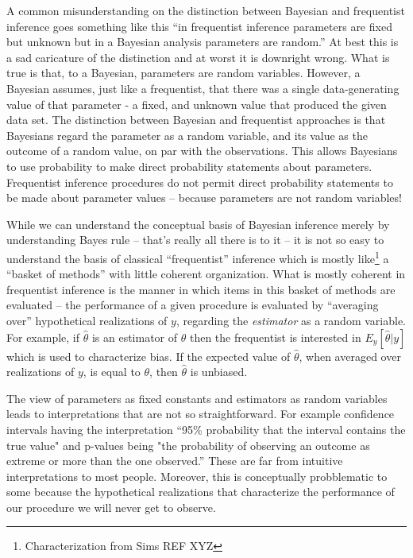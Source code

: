 A common misunderstanding on the distinction between Bayesian and
frequentist inference goes something like this ``in frequentist
inference parameters are fixed but unknown but in a Bayesian analysis
parameters are random.'' At best this is a sad caricature of the
distinction and at worst it is downright wrong. What is true is that,
to a Bayesian, parameters are random variables. However, a Bayesian
assumes, just like a frequentist, that there was a single
data-generating value of that parameter - a fixed, and unknown value
that produced the given data set.
The distinction between Bayesian and frequentist approaches is that
Bayesians regard the parameter as a random variable, and its value as
the outcome of a random value, on par with the observations. This
allows Bayesians to use probability to make direct probability
statements about parameters. Frequentist inference procedures do not
permit direct probability statements to be made about parameter
values -- because parameters are not random variables!

While we can understand the conceptual basis of Bayesian inference
merely by understanding Bayes rule -- that's really all there is to it
-- it is not so easy to understand the basis of classical
``frequentist'' inference which is mostly
like\footnote{Characterization from Sims REF XYZ} a ``basket of
methods'' with little coherent organization. What is mostly coherent
in frequentist inference is the manner in which items in this basket
of methods are evaluated -- the performance of a given procedure is
evaluated by ``averaging over'' hypothetical realizations of $y$,
regarding the {\it estimator} as a random variable. For example, if
$\hat{\theta}$ is an estimator of $\theta$ then the frequentist is
interested in $E_{y}[\hat{\theta}|y]$ which is used to characterize
bias. If the expected value of $\hat{\theta}$, when averaged over
realizations of $y$, is equal to $\theta$, then $\hat{\theta}$ is
unbiased. 

The view of parameters as fixed constants and estimators as random variables
leads to interpretations that are not so straightforward. For
example confidence intervals having the interpretation ``95\%
probability that the interval contains the true value" and p-values
being "the probability of observing an outcome as extreme or more than
the one observed.'' These are far from intuitive interpretations to
most people.  Moreover, this is conceptually probblematic to some
because the hypothetical realizations that characterize the
performance of our procedure we will never get to observe.

